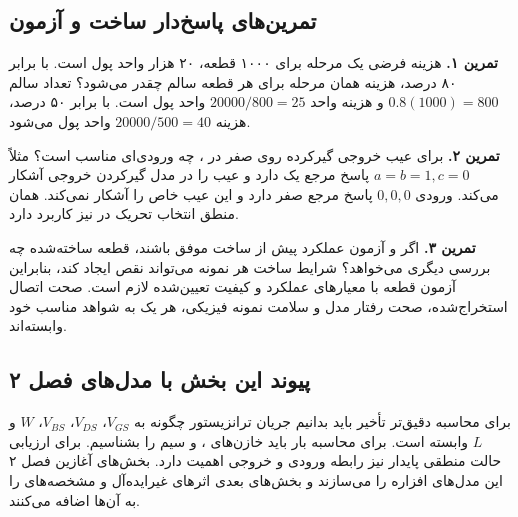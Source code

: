 \subsection{تمرین‌های پاسخ‌دار ساخت و آزمون}
\textbf{تمرین ۱.} هزینه فرضی یک مرحله برای ۱۰۰۰ قطعه، ۲۰ هزار واحد پول است.
با  برابر ۸۰ درصد، هزینه همان مرحله برای هر قطعه سالم چقدر می‌شود؟
تعداد سالم \(0.8(1000)=800\) و هزینه واحد \(20000/800=25\) واحد پول است.
با  برابر ۵۰ درصد، هزینه \(20000/500=40\) واحد پول می‌شود.

\textbf{تمرین ۲.} برای عیب خروجی گیرکرده روی صفر در ، چه ورودی‌ای مناسب است؟
مثلاً \(a=b=1,c=0\) پاسخ مرجع یک دارد و عیب را در مدل گیرکردن خروجی آشکار می‌کند.
ورودی \(0,0,0\) پاسخ مرجع صفر دارد و این عیب خاص را آشکار نمی‌کند.
همان منطق انتخاب تحریک در  نیز کاربرد دارد.

\textbf{تمرین ۳.} اگر  و آزمون عملکرد پیش از ساخت موفق باشند، قطعه ساخته‌شده
چه بررسی دیگری می‌خواهد؟ شرایط ساخت هر نمونه می‌تواند نقص ایجاد کند، بنابراین
آزمون قطعه با معیارهای عملکرد و کیفیت تعیین‌شده لازم است. صحت اتصال استخراج‌شده،
صحت رفتار مدل و سلامت نمونه فیزیکی، هر یک به شواهد مناسب خود وابسته‌اند.

\subsection{پیوند این بخش با مدل‌های فصل ۲}
برای محاسبه دقیق‌تر تأخیر باید بدانیم جریان ترانزیستور چگونه به
\(V_{GS}\)، \(V_{DS}\)، \(V_{BS}\)، \(W\) و \(L\) وابسته است.
برای محاسبه بار باید خازن‌های ،  و سیم را بشناسیم.
برای ارزیابی حالت منطقی پایدار نیز رابطه ورودی و خروجی  اهمیت دارد.
بخش‌های آغازین فصل ۲ این مدل‌های افزاره را می‌سازند و بخش‌های بعدی اثرهای غیرایده‌آل
و مشخصه‌های  را به آن‌ها اضافه می‌کنند.
\clearpage
